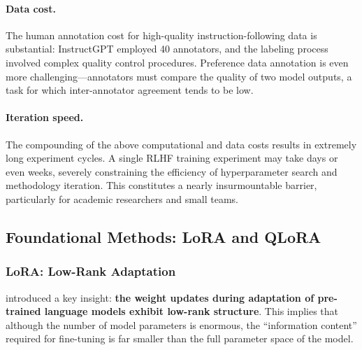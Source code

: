 \paragraph{Data cost.}
The human annotation cost for high-quality instruction-following data is substantial:
InstructGPT \cite{ouyang2022instructgpt} employed 40 annotators, and the labeling process involved complex quality control procedures.
Preference data annotation is even more challenging---annotators must compare the quality of two model outputs, a task for which inter-annotator agreement tends to be low.

\paragraph{Iteration speed.}
The compounding of the above computational and data costs results in extremely long experiment cycles.
A single RLHF training experiment may take days or even weeks, severely constraining the efficiency of hyperparameter search and methodology iteration.
This constitutes a nearly insurmountable barrier, particularly for academic researchers and small teams.


\subsection{Foundational Methods: LoRA and QLoRA}
\label{sec:t7-foundation}

\subsubsection{LoRA: Low-Rank Adaptation}
\label{sec:t7-lora}

 introduced a key insight:
\textbf{the weight updates during adaptation of pre-trained language models exhibit low-rank structure}.
This implies that although the number of model parameters is enormous, the ``information content'' required for fine-tuning is far smaller than the full parameter space of the model.

